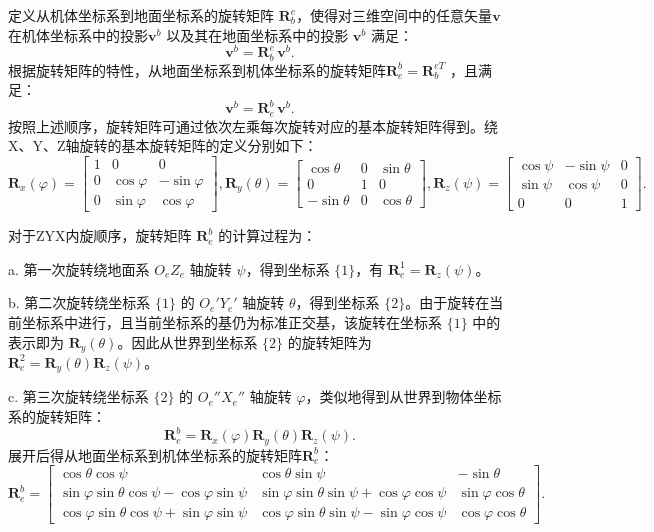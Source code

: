 定义从机体坐标系到地面坐标系的旋转矩阵 $\bm{R}_{b}^{e}$，使得对三维空间中的任意矢量$\bm{v}$ 在机体坐标系中的投影$\bm{v}^b$ 以及其在地面坐标系中的投影 $\bm{v}^b$ 满足：
\begin{equation}
\bm{v}^b = \bm{R}_{b}^{e} \, \bm{v}^b.
\end{equation}
根据旋转矩阵的特性，从地面坐标系到机体坐标系的旋转矩阵$\bm{R}_{e}^{b} = \bm{R}_{b}^{eT}$ ，且满足：
\begin{equation}
\bm{v}^b = \bm{R}_{e}^{b} \, \bm{v}^b.
\end{equation}
按照上述顺序，旋转矩阵可通过依次左乘每次旋转对应的基本旋转矩阵得到。绕X、Y、Z轴旋转的基本旋转矩阵的定义分别如下：
\begin{equation}
\bm{R}_x(\varphi) = \begin{bmatrix}
1 & 0 & 0 \\
0 & \cos\varphi & -\sin\varphi \\
0 & \sin\varphi & \cos\varphi
\end{bmatrix},
\bm{R}_y(\theta) = \begin{bmatrix}
\cos\theta & 0 & \sin\theta \\
0 & 1 & 0 \\
-\sin\theta & 0 & \cos\theta
\end{bmatrix},
\bm{R}_z(\psi) = \begin{bmatrix}
\cos\psi & -\sin\psi & 0 \\
\sin\psi & \cos\psi & 0 \\
0 & 0 & 1
\end{bmatrix}.
\label{eq:single_eular_R}
\end{equation}

对于ZYX内旋顺序，旋转矩阵 $\bm{R}_{e}^{b}$ 的计算过程为：

a. 第一次旋转绕地面系 $O_eZ_e$ 轴旋转 $\psi$，得到坐标系 $\{1\}$，有 $\bm{R}_{e}^{1} = \bm{R}_z(\psi)$。

b. 第二次旋转绕坐标系 $\{1\}$ 的 $O_e'Y_e'$ 轴旋转 $\theta$，得到坐标系 $\{2\}$。由于旋转在当前坐标系中进行，且当前坐标系的基仍为标准正交基，该旋转在坐标系 $\{1\}$ 中的表示即为 $\bm{R}_y(\theta)$。因此从世界到坐标系 $\{2\}$ 的旋转矩阵为 $\bm{R}_{e}^{2} = \bm{R}_y(\theta) \bm{R}_z(\psi)$。

c. 第三次旋转绕坐标系 $\{2\}$ 的 $O_e''X_e''$ 轴旋转 $\varphi$，类似地得到从世界到物体坐标系的旋转矩阵：
\begin{equation}
\bm{R}_{e}^{b} = \bm{R}_x(\varphi) \bm{R}_y(\theta) \bm{R}_z(\psi).
\end{equation}
展开后得从地面坐标系到机体坐标系的旋转矩阵$\bm{R}_{e}^{b}$：
\begin{equation}
\bm{R}_{e}^{b} = 
\begin{bmatrix}
\cos\theta\cos\psi & \cos\theta\sin\psi & -\sin\theta \\
\sin\varphi\sin\theta\cos\psi - \cos\varphi\sin\psi & \sin\varphi\sin\theta\sin\psi + \cos\varphi\cos\psi & \sin\varphi\cos\theta \\
\cos\varphi\sin\theta\cos\psi + \sin\varphi\sin\psi & \cos\varphi\sin\theta\sin\psi - \sin\varphi\cos\psi & \cos\varphi\cos\theta
\end{bmatrix}.
\end{equation}


